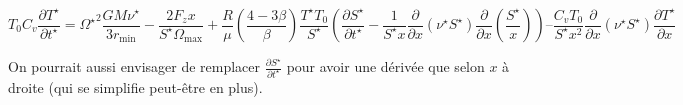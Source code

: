 \begin{equation}
    T_0 C_v \frac{\partial T^{\star}}{\partial t^{\star}} =
    {\Omega^\star}^2 \frac{G M \nu^\star}{3 r_\mathrm{min}} − \frac{2 F_z x}{S^\star \Omega_\mathrm{max}} +
    \frac{R}{\mu} \left(\frac{4−3\beta}{\beta}\right) \frac{T^\star T_0}{S^\star}
    \left( \frac{\partial S^\star}{\partial t^\star} − \frac{1}{S^\star x} \frac{\partial}{\partial x} \left(\nu^\star S^\star\right) \frac{\partial}{\partial x} \left(\frac{S^\star}{x}\right) \right) –
    \frac{C_v T_0}{S^\star x^2} \frac{\partial}{\partial x} \left(\nu^\star S^\star\right) \frac{\partial T^\star}{\partial x}
\end{equation}

On pourrait aussi envisager de remplacer $\frac{\partial S^\star}{\partial t^\star}$ pour avoir une dérivée que selon $x$ à droite (qui se simplifie peut-être en plus).


